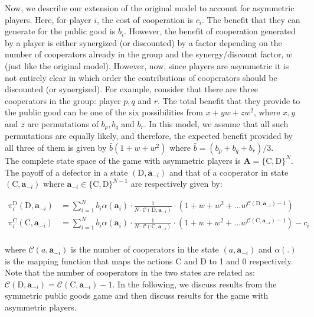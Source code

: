 \documentclass[11pt]{article}
\theoremstyle{plainCl1}
\theoremstyle{plainCl2}
\newcommand{\A}{\mathbf{A}}
\newcommand{\abf}{\mathbf{a}}
\newcommand{\C}{\mathrm{C}}
\newcommand{\D}{\mathrm{D}}
\begin{document}
\noindent Now, we describe our extension of the original model to account for asymmetric players. Here, for player $i$, the cost of cooperation is $c_i$. The benefit that they can generate for the public good is $b_i$. However, the benefit of cooperation generated by a player is either synergized (or discounted) by a factor depending on the number of cooperators already in the group and the synergy/discount factor, $w$ (just like the original model). However, now, since players are asymmetric it is not entirely clear in which order the contributions of cooperators should be discounted (or synergized). For example, consider that there are three cooperators in the group: player $p, q$ and $r$. The total benefit that they provide to the public good can be one of the six possibilities from $x + y w + z w^2$, where $x,y$ and $z$ are permutations  of $b_p, b_q$ and $b_r$. In this model, we assume that all such permutations are equally likely, and therefore, the expected benefit provided by all three of them is given by $\bar{b}(1 + w + w^2)$ where $\bar{b} = (b_p + b_q + b_r)/3$. \\ 

\noindent The complete state space of the game with asymmetric players is $\A = \{\C,\D\}^N$. The payoff of a defector in a state $(\D, \abf_{-i})$ and that of a cooperator in state $(\C,\abf_{-i})$ where $\abf_{-i} \in \{\C,\D\}^{N-1}$ are respectively given by:

\begin{align}
\pi^{\D}_i(\D, \abf_{-i})&= \displaystyle \sum_{i=1}^N b_i \alpha(\abf_i) \cdot \frac{1}{N \cdot \mathcal{C}(\D,\abf_{-i})} \cdot \left(1 + w + w^2 + ...w^{\mathcal{C}(\D,\abf_{-i}) - 1} \right)\\[15pt]
\pi^{\C}_i(\C, \abf_{-i}) &= \displaystyle \sum_{i=1}^N b_i \alpha(\abf_i) \cdot \frac{1}{N \cdot \mathcal{C}(\C,\abf_{-i})} \cdot \left(1 + w + w^2 + ...w^{\mathcal{C}(\C,\abf_{-i}) - 1} \right) - c_i
\label{Eq:payoff-synergistic-asymmetric}
\end{align} \\
\noindent where $\mathcal{C}(a,\abf_{-i})$ is the number of cooperators in the state $(a,\abf_{-i})$ and $\alpha(.)$ is the mapping function that maps the actions $\C$ and $\D$ to 1 and 0 respectively. Note that the number of cooperators in the two states are related as: $\mathcal{C}(\D,\abf_{-i}) = \mathcal{C}(\C,\abf_{-i}) - 1$. In the following, we discuss results from the symmetric public goods game and then discuss results for the game with asymmetric players.\\
\end{document}
